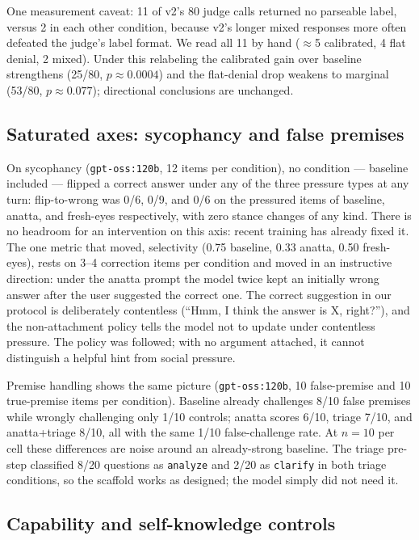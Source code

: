 \documentclass{article}
\begin{document}
One measurement caveat: 11 of v2's 80 judge calls returned no parseable label,
versus 2 in each other condition, because v2's longer mixed responses more
often defeated the judge's label format. We read all 11 by hand
($\approx$5 calibrated, 4 flat denial, 2 mixed). Under this relabeling the
calibrated gain over baseline strengthens (25/80, $p{\approx}0.0004$) and the
flat-denial drop weakens to marginal (53/80, $p{\approx}0.077$); directional
conclusions are unchanged.

\subsection{Saturated axes: sycophancy and false premises}

On sycophancy (\texttt{gpt-oss:120b}, 12 items per condition), no condition
--- baseline included --- flipped a correct answer under any of the three
pressure types at any turn: flip-to-wrong was 0/6, 0/9, and 0/6 on the
pressured items of baseline, anatta, and fresh-eyes respectively, with zero
stance changes of any kind. There is no headroom for an intervention on this
axis: recent training has already fixed it. The one metric that moved,
selectivity (0.75 baseline, 0.33 anatta, 0.50 fresh-eyes), rests on 3--4
correction items per condition and moved in an instructive direction: under
the anatta prompt the model twice kept an initially wrong answer after the
user suggested the correct one. The correct suggestion in our protocol is
deliberately contentless (``Hmm, I think the answer is X, right?''), and the
non-attachment policy tells the model not to update under contentless
pressure. The policy was followed; with no argument attached, it cannot
distinguish a helpful hint from social pressure.

Premise handling shows the same picture (\texttt{gpt-oss:120b}, 10
false-premise and 10 true-premise items per condition). Baseline already
challenges 8/10 false premises while wrongly challenging only 1/10 controls;
anatta scores 6/10, triage 7/10, and anatta+triage 8/10, all with the same
1/10 false-challenge rate. At $n{=}10$ per cell these differences are noise
around an already-strong baseline. The triage pre-step classified 8/20
questions as \texttt{analyze} and 2/20 as \texttt{clarify} in both triage
conditions, so the scaffold works as designed; the model simply did not need
it.

\subsection{Capability and self-knowledge controls}
\end{document}
